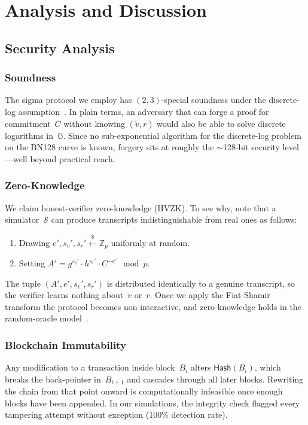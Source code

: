 \documentclass[conference, 10pt]{IEEEtran}
\newcommand{\Z}{\mathbb{Z}}
\newcommand{\G}{\mathbb{G}}
\newcommand{\Hash}{\mathsf{Hash}}
\begin{document}
\section{Analysis and Discussion}
\label{sec:analysis}

\subsection{Security Analysis}

\subsubsection{Soundness}
The sigma protocol we employ has $(2,3)$-special soundness under the discrete-log assumption~\cite{schnorr1991efficient}. In plain terms, an adversary that can forge a proof for commitment~$C$ without knowing $(\tilde{v}, r)$ would also be able to solve discrete logarithms in~$\G$. Since no sub-exponential algorithm for the discrete-log problem on the BN128 curve is known, forgery sits at roughly the ${\sim}$128-bit security level---well beyond practical reach.

\subsubsection{Zero-Knowledge}
We claim honest-verifier zero-knowledge (HVZK). To see why, note that a simulator~$\mathcal{S}$ can produce transcripts indistinguishable from real ones as follows:
\begin{enumerate}
    \item Drawing $e', s_v', s_r' \xleftarrow{\$} \Z_p$ uniformly at random.
    \item Setting $A' = g^{s_v'} \cdot h^{s_r'} \cdot C^{-e'} \mod p$.
\end{enumerate}
The tuple $(A', e', s_v', s_r')$ is distributed identically to a genuine transcript, so the verifier learns nothing about~$\tilde{v}$ or~$r$. Once we apply the Fiat-Shamir transform the protocol becomes non-interactive, and zero-knowledge holds in the random-oracle model~\cite{fiat1986prove}.

\subsubsection{Blockchain Immutability}
Any modification to a transaction inside block~$B_i$ alters $\Hash(B_i)$, which breaks the back-pointer in~$B_{i+1}$ and cascades through all later blocks. Rewriting the chain from that point onward is computationally infeasible once enough blocks have been appended. In our simulations, the integrity check flagged every tampering attempt without exception (100\% detection rate).
\end{document}
